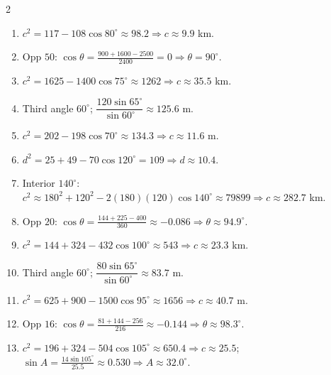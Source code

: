 \documentclass[11pt]{article}
\begin{document}
\begin{keybox}
\begin{multicols}{2}
\small
\begin{enumerate}[leftmargin=*,itemsep=3pt]
  \item $c^2=117-108\cos80^\circ\approx98.2\Rightarrow c\approx9.9$ km.
  \item Opp $50$: $\cos\theta=\tfrac{900+1600-2500}{2400}=0\Rightarrow\theta=90^\circ$.
  \item $c^2=1625-1400\cos75^\circ\approx1262\Rightarrow c\approx35.5$ km.
  \item Third angle $60^\circ$; $\dfrac{120\sin65^\circ}{\sin60^\circ}\approx125.6$ m.
  \item $c^2=202-198\cos70^\circ\approx134.3\Rightarrow c\approx11.6$ m.
  \item $d^2=25+49-70\cos120^\circ=109\Rightarrow d\approx10.4$.
  \item Interior $140^\circ$: $c^2\approx180^2+120^2-2(180)(120)\cos140^\circ\approx79899\Rightarrow c\approx282.7$ km.
  \item Opp $20$: $\cos\theta=\tfrac{144+225-400}{360}\approx-0.086\Rightarrow\theta\approx94.9^\circ$.
  \item $c^2=144+324-432\cos100^\circ\approx543\Rightarrow c\approx23.3$ km.
  \item Third angle $60^\circ$; $\dfrac{80\sin65^\circ}{\sin60^\circ}\approx83.7$ m.
  \item $c^2=625+900-1500\cos95^\circ\approx1656\Rightarrow c\approx40.7$ m.
  \item Opp $16$: $\cos\theta=\tfrac{81+144-256}{216}\approx-0.144\Rightarrow\theta\approx98.3^\circ$.
  \item $c^2=196+324-504\cos105^\circ\approx650.4\Rightarrow c\approx25.5$; $\sin A=\tfrac{14\sin105^\circ}{25.5}\approx0.530\Rightarrow A\approx32.0^\circ$.
\end{enumerate}
\end{multicols}
\end{keybox}
\end{document}
